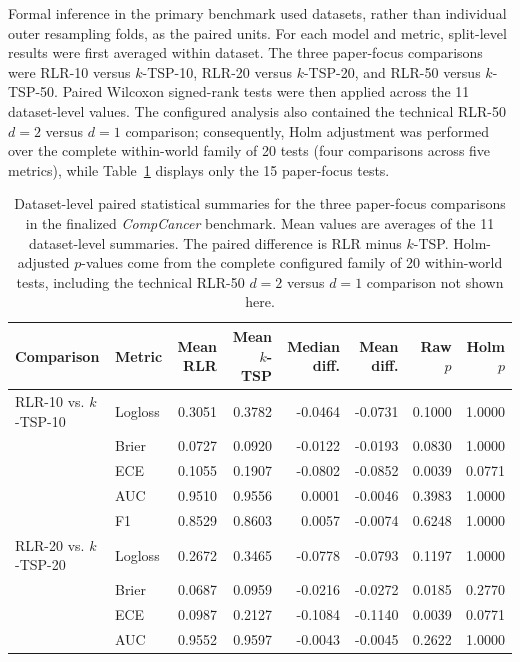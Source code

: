 \documentclass[11pt, a4paper]{article}
\begin{document}
Formal inference in the primary benchmark used datasets, rather than individual outer resampling folds, as the paired units. For each model and metric, split-level results were first averaged within dataset. The three paper-focus comparisons were RLR-10 versus $k$-TSP-10, RLR-20 versus $k$-TSP-20, and RLR-50 versus $k$-TSP-50. Paired Wilcoxon signed-rank tests were then applied across the 11 dataset-level values. The configured analysis also contained the technical RLR-50 $d=2$ versus $d=1$ comparison; consequently, Holm adjustment was performed over the complete within-world family of 20 tests (four comparisons across five metrics), while Table~\ref{tab:compcancer_stats} displays only the 15 paper-focus tests.

\begin{table}[!htbp]
\centering
\caption{Dataset-level paired statistical summaries for the three paper-focus comparisons in the finalized \emph{CompCancer} benchmark. Mean values are averages of the 11 dataset-level summaries. The paired difference is RLR minus $k$-TSP. Holm-adjusted $p$-values come from the complete configured family of 20 within-world tests, including the technical RLR-50 $d=2$ versus $d=1$ comparison not shown here.}
\label{tab:compcancer_stats}
{\scriptsize
\setlength{\tabcolsep}{3pt}
\renewcommand{\arraystretch}{1.15}
\begin{tabular}{llrrrrrr}
\toprule
\textbf{Comparison} & \textbf{Metric} & \textbf{Mean RLR} & \textbf{Mean $k$-TSP} & \textbf{Median diff.} & \textbf{Mean diff.} & \textbf{Raw $p$} & \textbf{Holm $p$} \\
\midrule
RLR-10 vs. $k$-TSP-10 & Logloss & 0.3051 & 0.3782 & -0.0464 & -0.0731 & 0.1000 & 1.0000 \\
 & Brier & 0.0727 & 0.0920 & -0.0122 & -0.0193 & 0.0830 & 1.0000 \\
 & ECE & 0.1055 & 0.1907 & -0.0802 & -0.0852 & 0.0039 & 0.0771 \\
 & AUC & 0.9510 & 0.9556 & 0.0001 & -0.0046 & 0.3983 & 1.0000 \\
 & F1 & 0.8529 & 0.8603 & 0.0057 & -0.0074 & 0.6248 & 1.0000 \\
\midrule
RLR-20 vs. $k$-TSP-20 & Logloss & 0.2672 & 0.3465 & -0.0778 & -0.0793 & 0.1197 & 1.0000 \\
 & Brier & 0.0687 & 0.0959 & -0.0216 & -0.0272 & 0.0185 & 0.2770 \\
 & ECE & 0.0987 & 0.2127 & -0.1084 & -0.1140 & 0.0039 & 0.0771 \\
 & AUC & 0.9552 & 0.9597 & -0.0043 & -0.0045 & 0.2622 & 1.0000 \\

\end{tabular}}
\end{table}
\end{document}
